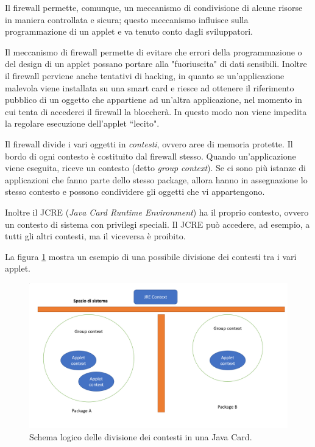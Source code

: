 Il firewall permette, comunque, un meccanismo di condivisione di alcune risorse in maniera controllata e sicura; questo meccanismo influisce sulla programmazione di un applet e va tenuto conto dagli sviluppatori.

Il meccanismo di firewall permette di evitare che errori della programmazione o del design di un applet possano portare alla "fuoriuscita" di dati sensibili. Inoltre il firewall perviene anche tentativi di hacking, in quanto se un'applicazione malevola viene installata su una smart card e riesce ad ottenere il riferimento pubblico di un oggetto che appartiene ad un'altra applicazione, nel momento in cui tenta di accederci il firewall la bloccherà. In questo modo non viene impedita la regolare esecuzione dell'applet ``lecito".

Il firewall divide i vari oggetti in \textit{contesti}, ovvero aree di memoria protette. Il bordo di ogni contesto è costituito dal firewall stesso. Quando un'applicazione viene eseguita, riceve un contesto (detto \textit{group context}). Se ci sono più istanze di applicazioni che fanno parte dello stesso package, allora hanno in assegnazione lo stesso contesto e possono condividere gli oggetti che vi appartengono.

Inoltre il JCRE (\textit{Java Card Runtime Environment}) ha il proprio contesto, ovvero un contesto di sistema con privilegi speciali. Il JCRE può accedere, ad esempio, a tutti gli altri contesti, ma il viceversa è proibito.

La figura \ref{fig:context} mostra un esempio di una possibile divisione dei contesti tra i vari applet.
\cite{applet_firewall}

\begin{figure}[h!]
  \centering
  \includegraphics[width=400pt]{pictures/context.png}
  \caption{Schema logico delle divisione dei contesti in una Java Card.}
  \label{fig:context}
\end{figure}

